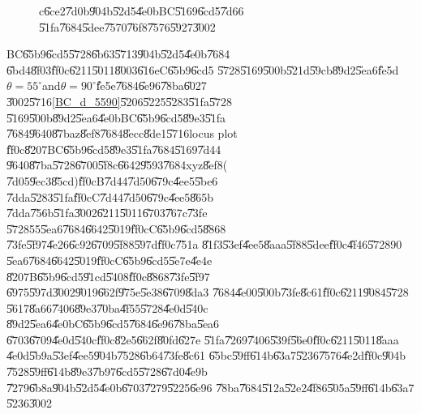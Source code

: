 \begin{figure}[th]
\caption{c\U{6ce2}\U{7d0b}\U{904b}\U{52d5}\U{4e0b}BC\U{5169}\U{6cd5}\U{7d66}%
\U{51fa}\U{7684}\U{5dee}\U{7570}\U{76f8}\U{7576}\U{5927}\U{3002}}
\label{BC_c_drift_fig}
\begin{center}

\end{center}
\end{figure}

\clearpage%

\begin{case}
BC\U{65b9}\U{6cd5}\U{5728}\U{6b63}\U{5713}\U{904b}\U{52d5}\U{4e0b}\U{7684}%
\U{6bd4}\U{8f03}\U{ff0c}\U{6211}\U{5011}\U{8003}\U{616e}C\U{65b9}\U{6cd5}%
\U{5728}\U{5169}\U{500b}\U{521d}\U{59cb}\U{89d2}\U{5ea6}\U{fe5d}$\theta
=55^{\circ }$and$\theta =90^{\circ }$\U{fe5e}\U{7684}\U{6e96}\U{78ba}\U{6027}%
\U{3002}\U{5716}\ref{BC_d_5590}\U{5206}\U{5225}\U{5283}\U{51fa}\U{5728}%
\U{5169}\U{500b}\U{89d2}\U{5ea6}\U{4e0b}BC\U{65b9}\U{6cd5}\U{89e3}\U{51fa}%
\U{7684}\U{9640}\U{87ba}z\U{8ef8}\U{7684}\U{8ecc}\U{8de1}\U{5716}locus plot%
\U{ff0c}\U{8207}BC\U{65b9}\U{6cd5}\U{89e3}\U{51fa}\U{7684}\U{5169}\U{7d44}%
\U{9640}\U{87ba}\U{5728}\U{6700}\U{5f8c}\U{6642}\U{9593}\U{7684}xyz\U{8ef8}(%
\U{7d05}\U{9ec3}\U{85cd})\U{ff0c}B\U{7d44}\U{7d50}\U{679c}\U{4ee5}\U{5be6}%
\U{7dda}\U{5283}\U{51fa}\U{ff0c}C\U{7d44}\U{7d50}\U{679c}\U{4ee5}\U{865b}%
\U{7dda}\U{756b}\U{51fa}\U{3002}\U{6211}\U{5011}\U{6703}\U{767c}\U{73fe}%
\U{5728}55\U{5ea6}\U{7684}\U{6642}\U{5019}\U{ff0c}C\U{65b9}\U{6cd5}\U{8868}%
\U{73fe}\U{5f97}\U{4e26}\U{6c92}\U{6709}\U{5f88}\U{597d}\U{ff0c}\U{751a}%
\U{81f3}\U{53ef}\U{4ee5}\U{8aaa}\U{5f88}\U{5dee}\U{ff0c}\U{4f46}\U{5728}90%
\U{5ea6}\U{7684}\U{6642}\U{5019}\U{ff0c}C\U{65b9}\U{6cd5}\U{5e7e}\U{4e4e}%
\U{8207}B\U{65b9}\U{6cd5}\U{91cd}\U{5408}\U{ff0c}\U{8868}\U{73fe}\U{5f97}%
\U{6975}\U{597d}\U{3002}\U{9019}\U{662f}\U{975e}\U{5e38}\U{6709}\U{8da3}%
\U{7684}\U{4e00}\U{500b}\U{73fe}\U{8c61}\U{ff0c}\U{6211}\U{9084}\U{5728}%
\U{5617}\U{8a66}\U{7406}\U{89e3}\U{70ba}\U{4f55}\U{5728}\U{4e0d}\U{540c}%
\U{89d2}\U{5ea6}\U{4e0b}C\U{65b9}\U{6cd5}\U{7684}\U{6e96}\U{78ba}\U{5ea6}%
\U{6703}\U{6709}\U{4e0d}\U{540c}\U{ff0c}\U{82e5}\U{662f}\U{80fd}\U{627e}%
\U{51fa}\U{7269}\U{7406}\U{539f}\U{56e0}\U{ff0c}\U{6211}\U{5011}\U{8aaa}%
\U{4e0d}\U{5b9a}\U{53ef}\U{4ee5}\U{904b}\U{7528}\U{6b64}\U{73fe}\U{8c61}%
\U{65bc}\U{59ff}\U{614b}\U{63a7}\U{5236}\U{7576}\U{4e2d}\U{ff0c}\U{904b}%
\U{7528}\U{59ff}\U{614b}\U{89e3}\U{7b97}\U{6cd5}\U{5728}\U{67d0}\U{4e9b}%
\U{7279}\U{6b8a}\U{904b}\U{52d5}\U{4e0b}\U{6703}\U{7279}\U{5225}\U{6e96}%
\U{78ba}\U{7684}\U{512a}\U{52e2}\U{4f86}\U{505a}\U{59ff}\U{614b}\U{63a7}%
\U{5236}\U{3002}
\end{case}

